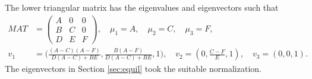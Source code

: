 \documentclass[a4paper,11pt]{article}
\begin{document}
The lower triangular matrix has the eigenvalues and eigenvectors such that
\begin{align*}
 MAT &= \begin{pmatrix}
        A & 0 & 0\\
        B & C & 0\\
        D & E & F
       \end{pmatrix}, \quad
 \mu_1 = A, \quad\mu_2 = C, \quad\mu_3 = F,\\
 v_1 &= \Big( \frac{ (A-C)(A-F) }{ D(A-C) + BE }, \frac{ B(A-F) }{ D(A-C) + BE }, 1), \quad  v_2 = (0, \frac{C-F}{E}, 1), \quad v_3 = (0,0,1).
\end{align*}
The eigenvectors in Section \ref{sec:equil} took the suitable normalization.
\end{document}
